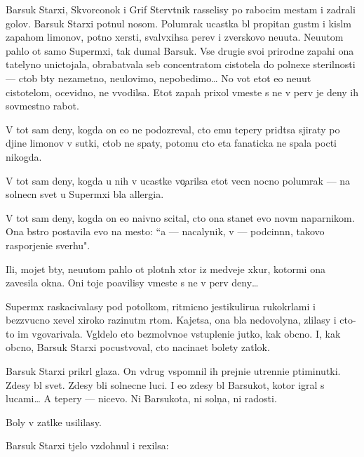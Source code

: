\documentclass[12pt]{book}
\begin{document}
Barsuk Starxi{\y}, Skvorconok i Grif Sterv{\ia}tnik rasselisy po rabocim mestam i zadrali golov{\yi}. Barsuk Starxi{\y} pot{\ia}nul nosom. Polumrak ucastka b{\yi}l propitan gust{\yi}m i kisl{\yi}m zapahom limonov, potno{\y} xersti, sval{\ia}vxihsa per{\y}ev i zverskovo neu{\y}uta. Neu{\y}utom pahlo ot samo{\y} Superm{\yi}xi, tak dumal Barsuk. Vse drugi{\y}e svo{\y}i prirodn{\yi}{\y}e zapahi ona t{\x}atelyno unictojala, obrabat{\yi}vala seb{\ia} concentratom cistotela do polne{\y}xe{\y} sterilnosti — ctob{\yi} b{\yi}ty nezametno{\y}, neulovimo{\y}, nepobedimo{\y}… No vot etot {\y}e{\y}o neu{\y}ut cistotelom, ocevidno, ne v{\yi}vodilsa. Etot zapah prixol vmeste s ne{\y} v perv{\yi}{\y} je deny ih sovmestno{\y} rabot{\yi}.

V tot sam{\yi}{\y} deny, kogda on {\y}e{\x}o ne podozreval, cto {\y}emu tepery prid{\e}tsa sjiraty po d{\iu}jine limonov v sutki, ctob{\yi} ne spaty, potomu cto eta fanaticka ne spala pocti nikogda.

V tot sam{\yi}{\y} deny, kogda u nih v ucastke vo{\c}arilsa etot vecn{\yi}{\y} nocno{\y} polumrak — na solnecn{\yi}{\y} svet u Superm{\yi}xi b{\yi}la allergi{\y}a.

V tot sam{\yi}{\y} deny, kogda on {\y}e{\x}o naivno scital, cto ona stanet {\y}evo nov{\yi}m naparnikom. Ona b{\yi}stro postavila {\y}evo na mesto: ``{\Y}a — nacalynik, v{\yi} — podcin{\e}nn{\yi}{\y}, takovo raspor{\ia}jeni{\y}e sverhu".

Ili, mojet b{\yi}ty, neu{\y}utom pahlo ot plotn{\yi}h xtor iz medvej{\y}e{\y} xkur{\yi}, kotor{\yi}mi ona zavesila okna. Oni toje po{\y}avilisy vmeste s ne{\y} v perv{\yi}{\y} deny…

Superm{\yi}x raskacivalasy pod potolkom, ritmicno jestikuliru{\y}a ruko\-kr{\yi}l{\y}a\-mi i bezzvucno xevel{\ia} xiroko razinut{\yi}m rtom. Kajetsa, ona b{\yi}la nedovolyna, zlilasy i cto-to im v{\yi}govarivala. V{\yi}gl{\ia}delo eto bezmolvno{\y}e v{\yi}stupleni{\y}e jutko, kak ob{\yi}cno. I, kak ob{\yi}cno, Barsuk Starxi{\y} pocustvoval, cto nacina{\y}et bolety zat{\yi}lok.

Barsuk Starxi{\y} prikr{\yi}l glaza. On vdrug vspomnil ih prejni{\y}e utrenni{\y}e p{\ia}timinutki. Zdesy b{\yi}l svet. Zdesy b{\yi}li solnecn{\yi}{\y}e luci. I {\y}e{\x}o zdesy b{\yi}l Barsukot, kotor{\yi}{\y} igral s lucami… A tepery — nicevo. Ni Barsukota, ni soln{\c}a, ni radosti.

Boly v zat{\yi}lke usililasy.

Barsuk Starxi{\y} t{\ia}jelo vzdohnul i rexilsa:
\end{document}
